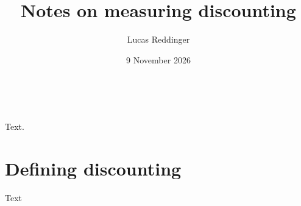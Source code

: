 \documentclass[
    fontsize=12pt,fleqn,
    letterpaper,oneside,paper=portrait,
]{scrartcl}
\title{Notes on measuring discounting}
\author{Lucas Reddinger}
\date{9 November 2026}
\makeatletter
\renewcommand{\maketitle}{%
  \begin{center}
    {\sffamily\LARGE \@title\par}
    \vspace{0.25\baselineskip}
    \@author\\
    \@date
  \end{center}
}
\makeatother
\begin{document}
\maketitle
\suppressfloats[t]%

Text.

\section{Defining discounting}\label{sec:definition}

Text
\end{document}

